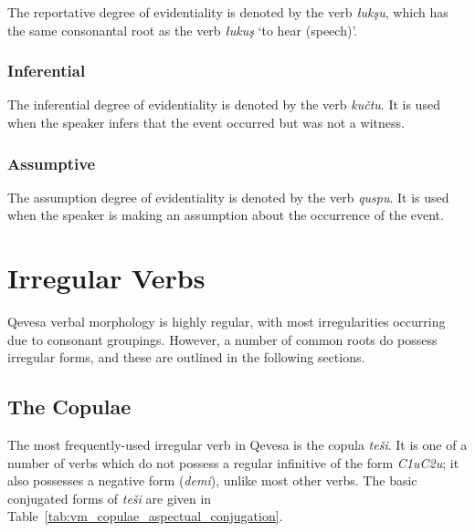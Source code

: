 \documentclass[grammar]{subfiles}
\begin{document}
  The reportative degree of evidentiality is denoted by the verb \textit{łukşu}, which has the same consonantal root as the verb \textit{łukuş} ‘to hear (speech)’.

  \subsubsection{Inferential}
  \label{sssec:vm_evd_inferential}

  The inferential degree of evidentiality is denoted by the verb \textit{kučtu}. It is used when the speaker infers that the event occurred but was not a witness.

  \subsubsection{Assumptive}
  \label{sssec:vm_evd_assumption}

  The assumption degree of evidentiality is denoted by the verb \textit{quspu}. It is used when the speaker is making an assumption about the occurrence of the event.

  \section{Irregular Verbs}
  \label{sec:vm_irregular}

  Qevesa verbal morphology is highly regular, with most irregularities occurring due to consonant groupings. %
  However, a number of common roots do possess irregular forms, and these are outlined in the following sections.

  \subsection{The Copulae}
  \label{ssec:vm_copulae}

  The most frequently-used irregular verb in Qevesa is the copula \textit{teši}. It is one of a number of verbs which do not possess a regular infinitive of the form \textit{C\sub1uC\sub2u}; it also possesses a negative form (\textit{demi}\footnotemark{}), unlike most other verbs. The basic conjugated forms of \textit{teši} are given in Table~\ref{tab:vm_copulae_aspectual_conjugation}.
\end{document}
